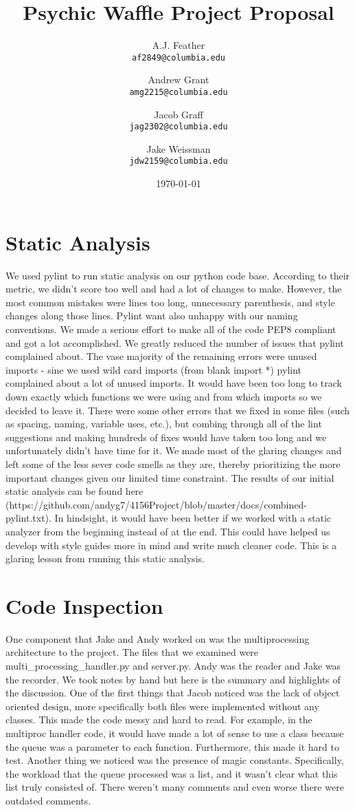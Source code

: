 \documentclass{article}
\title{Psychic Waffle Project Proposal}
\author{
    A.J. Feather\\
    \texttt{af2849@columbia.edu}
    \and
    Andrew Grant\\
    \texttt{amg2215@columbia.edu}
    \and
    Jacob Graff\\
    \texttt{jag2302@columbia.edu}
    \and
    Jake Weissman\\
    \texttt{jdw2159@columbia.edu}
}
\date{\today}
\begin{document}
\maketitle

\section{Static Analysis}
We used pylint to run static analysis on our python code base. According to their metric, we didn't score too well and had a lot of changes to make. However, the most common mistakes were lines too long, unnecessary parenthesis, and style changes along those lines. Pylint want also unhappy with our naming conventions. We made a serious effort to make all of the code PEP8 compliant and got a lot accomplished. We greatly reduced the number of issues that pylint complained about. The vase majority of the remaining errors were unused imports - sine we used wild card imports (from blank import *) pylint complained about a lot of unused imports. It would have been too long to track down exactly which functions we were using and from which imports so we decided to leave it. There were some other errors that we fixed in some files (such as spacing, naming, variable uses, etc.), but combing through all of the lint suggestions and making hundreds of fixes would have taken too long and we unfortunately didn't have time for it. We made most of the glaring changes and left some of the less sever code smells as they are, thereby prioritizing the more important changes given our limited time constraint. The results of our initial static analysis can be found here (https://github.com/andyg7/4156Project/blob/master/docs/combined-pylint.txt). In hindsight, it would have been better if we worked with a static analyzer from the beginning instead of at the end. This could have helped us develop with style guides more in mind and write much cleaner code. This is a glaring lesson from running this static analysis.

\section{Code Inspection}
One component that Jake and Andy worked on was the multiprocessing architecture to the project. The files that we examined were multi\_processing\_handler.py and server.py. Andy was the reader and Jake was the recorder. We took notes by hand but here is the summary and highlights of the discussion. One of the first things that Jacob noticed was the lack of object oriented design, more specifically both files were implemented without any classes. This made the code messy and hard to read. For example, in the multiproc handler code, it would have made a lot of sense to use a class because the queue was a parameter to each function. Furthermore, this made it hard to test. Another thing we noticed was the presence of magic constants. Specifically, the workload that the queue processed was a list, and it wasn't clear what this list truly consisted of. There weren't many comments and even worse there were outdated comments.
\end{document}
